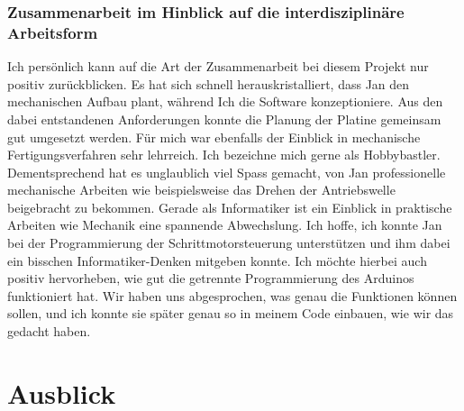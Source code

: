 \subsubsection{Zusammenarbeit im Hinblick auf die interdisziplinäre Arbeitsform}
Ich persönlich kann auf die Art der Zusammenarbeit bei diesem Projekt nur positiv zurückblicken. Es hat sich schnell herauskristalliert, dass Jan den mechanischen Aufbau plant, während Ich die Software konzeptioniere. Aus den dabei entstandenen Anforderungen konnte die Planung der Platine gemeinsam gut umgesetzt werden. Für mich war ebenfalls der Einblick in mechanische Fertigungsverfahren sehr lehrreich. Ich bezeichne mich gerne als Hobbybastler. Dementsprechend hat es unglaublich viel Spass gemacht, von Jan professionelle mechanische Arbeiten wie beispielsweise das Drehen der Antriebswelle beigebracht zu bekommen. Gerade als Informatiker ist ein Einblick in praktische Arbeiten wie Mechanik eine spannende Abwechslung. Ich hoffe, ich konnte Jan bei der Programmierung der Schrittmotorsteuerung unterstützen und ihm dabei ein bisschen Informatiker-Denken mitgeben konnte. Ich möchte hierbei auch positiv hervorheben, wie gut die getrennte Programmierung des Arduinos funktioniert hat. Wir haben uns abgesprochen, was genau die Funktionen können sollen, und ich konnte sie später genau so in meinem Code einbauen, wie wir das gedacht haben. 


\section{Ausblick}
\label{sec:ausblick}

